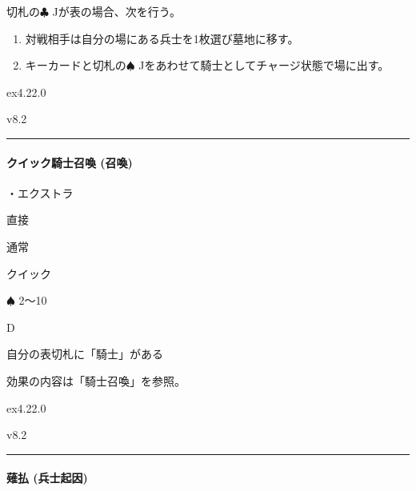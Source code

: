 \documentclass[letterpaper,10pt,dvipdfmx]{sphinxmanual}
\begin{document}
\sphinxAtStartPar
切札の{\normalsize $\clubsuit$} Jが表の場合、次を行う。
\begin{enumerate}
%
\item {} 
\sphinxAtStartPar
対戦相手は自分の場にある兵士を1枚選び墓地に移す。

\item {} 
\sphinxAtStartPar
キーカードと切札の{\normalsize $\spadesuit$} Jをあわせて騎士としてチャージ状態で場に出す。

\end{enumerate}

\sphinxAtStartPar
{}  ex4.22.0

\sphinxAtStartPar
{}  v8.2


\bigskip\hrule\bigskip



\paragraph{クイック騎士召喚 (召喚)}
\label{\detokenize{auto/frameActionlist:act-quicksummonknight}}\label{\detokenize{auto/frameActionlist:id82}}
\sphinxAtStartPar
{}

\sphinxAtStartPar
・エクストラ

\sphinxAtStartPar
{} 直接

\sphinxAtStartPar
{} 通常

\sphinxAtStartPar
{} クイック

\sphinxAtStartPar
{} {\normalsize $\spadesuit$} 2〜10

\sphinxAtStartPar
{} D

\sphinxAtStartPar
{}

\sphinxAtStartPar
自分の表切札に「騎士」がある

\sphinxAtStartPar
{}

\sphinxAtStartPar
効果の内容は「騎士召喚」を参照。

\sphinxAtStartPar
{}  ex4.22.0

\sphinxAtStartPar
{}  v8.2


\bigskip\hrule\bigskip



\paragraph{薙払 (兵士起因)}
\label{\detokenize{auto/frameActionlist:act-knightsweep}}\label{\detokenize{auto/frameActionlist:id83}}
\sphinxAtStartPar
{}
\end{document}
